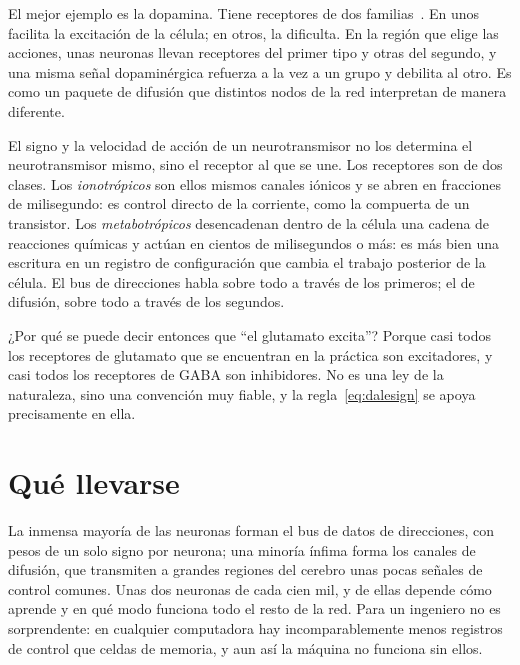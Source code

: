 El mejor ejemplo es la dopamina. Tiene receptores de dos familias~\cite{Beaulieu2011}. En unos facilita la excitación de la célula; en otros, la dificulta. En la región que elige las acciones, unas neuronas llevan receptores del primer tipo y otras del segundo, y una misma señal dopaminérgica refuerza a la vez a un grupo y debilita al otro. Es como un paquete de difusión que distintos nodos de la red interpretan de manera diferente.

\begin{keyblock}
\begin{proposition}
\label{prop:receptor}
El signo y la velocidad de acción de un neurotransmisor no los determina el neurotransmisor mismo, sino el receptor al que se une. Los receptores son de dos clases. Los \emph{ionotrópicos} son ellos mismos canales iónicos y se abren en fracciones de milisegundo: es control directo de la corriente, como la compuerta de un transistor. Los \emph{metabotrópicos} desencadenan dentro de la célula una cadena de reacciones químicas y actúan en cientos de milisegundos o más: es más bien una escritura en un registro de configuración que cambia el trabajo posterior de la célula. El bus de direcciones habla sobre todo a través de los primeros; el de difusión, sobre todo a través de los segundos.
\end{proposition}
\end{keyblock}

¿Por qué se puede decir entonces que “el glutamato excita”? Porque casi todos los receptores de glutamato que se encuentran en la práctica son excitadores, y casi todos los receptores de GABA son inhibidores. No es una ley de la naturaleza, sino una convención muy fiable, y la regla~\eqref{eq:dalesign} se apoya precisamente en ella.

\section{Qué llevarse}

La inmensa mayoría de las neuronas forman el bus de datos de direcciones, con pesos de un solo signo por neurona; una minoría ínfima forma los canales de difusión, que transmiten a grandes regiones del cerebro unas pocas señales de control comunes. Unas dos neuronas de cada cien mil, y de ellas depende cómo aprende y en qué modo funciona todo el resto de la red. Para un ingeniero no es sorprendente: en cualquier computadora hay incomparablemente menos registros de control que celdas de memoria, y aun así la máquina no funciona sin ellos.

